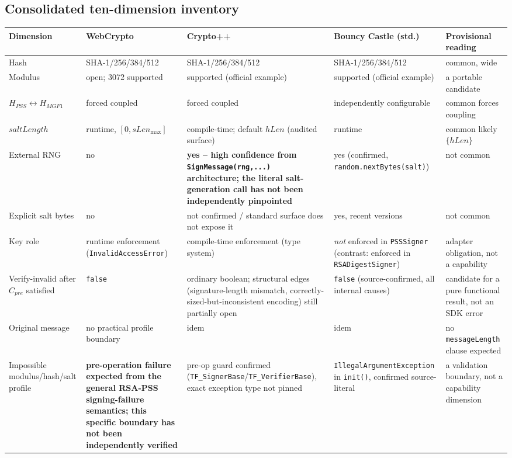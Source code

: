 \documentclass[11pt,a4paper]{article}
\begin{document}
\subsection{Consolidated ten-dimension inventory}\label{sec:pss-consolidated}
\begin{center}
\begin{tabularx}{\textwidth}{@{}l>{\raggedright\arraybackslash}X>{\raggedright\arraybackslash}X>{\raggedright\arraybackslash}X>{\raggedright\arraybackslash}X@{}}
\toprule
Dimension & WebCrypto & Crypto++ & Bouncy Castle (std.) & Provisional reading \\
\midrule
Hash & SHA-1/256/384/512 & SHA-1/256/384/512 & SHA-1/256/384/512 & common, wide \\
Modulus & open; 3072 supported & 3072 supported (official example) & 3072 supported (official example) & 3072 a portable candidate \\
$H_{PSS} \leftrightarrow H_{MGF1}$ & forced coupled & forced coupled & independently configurable & common forces coupling \\
$saltLength$ & runtime, $[0, sLen_{\max}]$ & compile-time; default $hLen$ (audited surface) & runtime & common likely $\{hLen\}$ \\
External RNG & no & \textbf{yes -- high confidence from \texttt{SignMessage(rng,...)} architecture; the literal salt-generation call has not been independently pinpointed} & yes (confirmed, \texttt{random.nextBytes(salt)}) & not common \\
Explicit salt bytes & no & not confirmed / standard surface does not expose it & yes, recent versions & not common \\
Key role & runtime enforcement (\texttt{InvalidAccessError}) & compile-time enforcement (type system) & \emph{not} enforced in \texttt{PSSSigner} (contrast: enforced in \texttt{RSADigestSigner}) & adapter obligation, not a capability \\
Verify-invalid after $C_{pre}$ satisfied & \texttt{false} & ordinary boolean; structural edges (signature-length mismatch, correctly-sized-but-inconsistent encoding) still partially open & \texttt{false} (source-confirmed, all internal causes) & candidate for a pure functional result, not an SDK error \\
Original message & no practical profile boundary & idem & idem & no \texttt{messageLength} clause expected \\
Impossible modulus/hash/salt profile & \textbf{pre-operation failure expected from the general RSA-PSS signing-failure semantics; this specific boundary has not been independently verified} & pre-op guard confirmed (\texttt{TF\_SignerBase}/\texttt{TF\_VerifierBase}), exact exception type not pinned & \texttt{IllegalArgumentException} in \texttt{init()}, confirmed source-literal & a validation boundary, not a capability dimension \\
\bottomrule
\end{tabularx}
\end{center}
\end{document}
